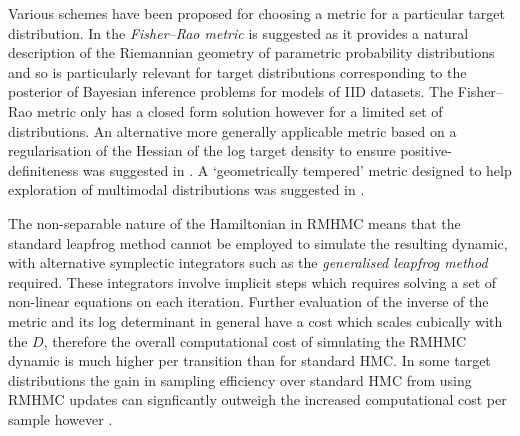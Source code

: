 Various schemes have been proposed for choosing a metric for a particular target distribution. In \citep{girolami2011riemann} the \emph{Fisher--Rao metric} \citep{amari1982differential} is suggested as it provides a natural description of the Riemannian geometry of parametric probability distributions and so is particularly relevant for target distributions corresponding to the posterior of Bayesian inference problems for models of \acs{IID} datasets. The Fisher--Rao metric only has a closed form solution however for a limited set of distributions. An alternative more generally applicable metric based on a regularisation of the Hessian of the log target density to ensure positive-definiteness was suggested in \citep{betancourt2013general}. A `geometrically tempered' metric designed to help exploration of multimodal distributions was suggested in \citep{nishimura2016geometrically}.

The non-separable nature of the Hamiltonian in \ac{RMHMC} means that the standard leapfrog method cannot be employed to simulate the resulting dynamic, with alternative symplectic integrators such as the \emph{generalised leapfrog method} \citep{leimkuhler2004simulating} required. These integrators involve implicit steps which requires solving a set of non-linear equations on each iteration. Further evaluation of the inverse of the metric and its log determinant in general have a cost which scales cubically with the $D$, therefore the overall computational cost of simulating the \ac{RMHMC} dynamic is much higher per transition than for standard \ac{HMC}. In some target distributions the gain in sampling efficiency over standard \ac{HMC} from using \ac{RMHMC} updates can signficantly outweigh the increased computational cost per sample however \citep{girolami2011riemann,betancourt2013general}. 




